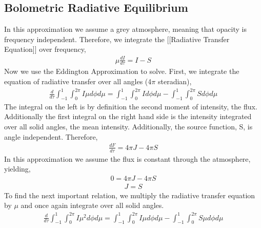\documentclass{article}
\begin{document}
\subsection*{ Bolometric Radiative Equilibrium}

In this approximation we assume a grey atmosphere, meaning that opacity is frequency independent. Therefore, we integrate the [[Radiative Transfer Equation]] over frequency,
\begin{align}
\mu \frac{dI}{d \tau} = I - S
\end{align}
Now we use the Eddington Approximation to solve. First, we integrate the equation of radiative transfer over all angles (4$\pi$ steradian),
\begin{align}
\frac{d}{d \tau} \int_{-1}^{1} \int_{0}^{2 \pi} I \mu d \phi d \mu  = \int_{-1}^{1} \int_{0}^{2 \pi} I d \phi d \mu -  \int_{-1}^{1} \int_{0}^{2 \pi} S d \phi d \mu
\end{align}
The integral on the left is by definition the second moment of intensity, the flux. Additionally the first integral on the right hand side is the intensity integrated over all solid angles, the mean intensity. Additionally, the source function, S, is angle independent. Therefore,
\begin{align}
\frac{dF}{d \tau} = 4 \pi J - 4 \pi S
\end{align}
In this approximation we assume the flux is constant through the atmosphere, yielding,
\begin{align}
0 = 4 \pi J - 4 \pi S
\end{align}
\begin{align}
J = S
\end{align}
To find the next important relation, we multiply the radiative transfer equation by $\mu$ and once again integrate over all solid angles.
\begin{align}
\frac{d}{d \tau} \int_{-1}^{1} \int_{0}^{2 \pi} I \mu^2 d \phi d \mu  = \int_{-1}^{1} \int_{0}^{2 \pi} I \mu d \phi d \mu -  \int_{-1}^{1} \int_{0}^{2 \pi} S \mu d \phi d \mu
\end{align}
\end{document}
